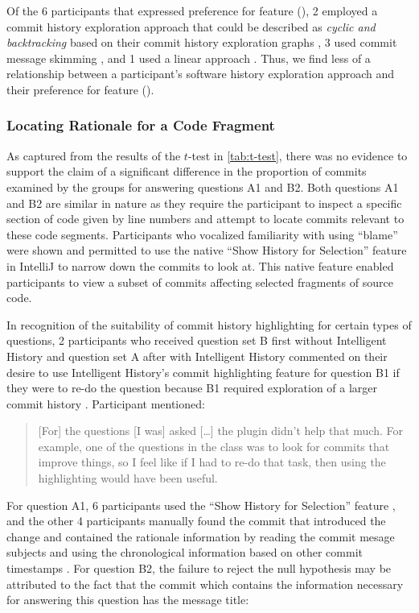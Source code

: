 Of the 6 participants that expressed preference for feature (), 
2 employed a commit history exploration approach that could be described as \textit{cyclic and backtracking} based on their commit history exploration graphs ,
3 used commit message skimming , and 1 used a linear approach .
Thus, we find less of a relationship between a participant's software history exploration approach and their preference for feature ().

\subsubsection{Locating Rationale for a Code Fragment}

As captured from the results of the $t$-test in \autoref{tab:t-test}, 
there was no evidence to support the claim of a significant difference in the proportion of commits examined by the groups for answering questions A1 and B2.
Both questions A1 and B2 are similar in nature as they require the participant to inspect a specific section of code given by line numbers and attempt to locate commits relevant to these code segments.
Participants who vocalized familiarity with using  ``blame'' were shown and permitted to use the native ``Show History for Selection'' feature in IntelliJ to narrow down the commits to look at.
This native feature enabled participants to view a subset of commits affecting selected fragments of source code.

In recognition of the suitability of commit history highlighting for certain types of questions,
2 participants who received question set B first without Intelligent History and question set A 
after with Intelligent History commented on their desire to use Intelligent History's commit highlighting feature for question B1
if they were to re-do the question because B1 required exploration of a larger commit history .
Participant  mentioned:

\begin{quote}
  [For] the questions [I was] asked [\dots] the plugin didn’t help that much. 
  For example, one of the questions in the  class was to look for commits that improve things, 
  so I feel like if I had to re-do that task, then using the highlighting would have been useful.
\end{quote}

For question A1, 6 participants used the ``Show History for Selection'' feature ,
and the other 4 participants manually found the commit that introduced the change and contained the rationale information by reading the commit mesage subjects and using the chronological information based on other commit timestamps .
For question B2, the failure to reject the null hypothesis may be attributed to the fact that the commit  which contains the information necessary for answering this question has the message title: 

